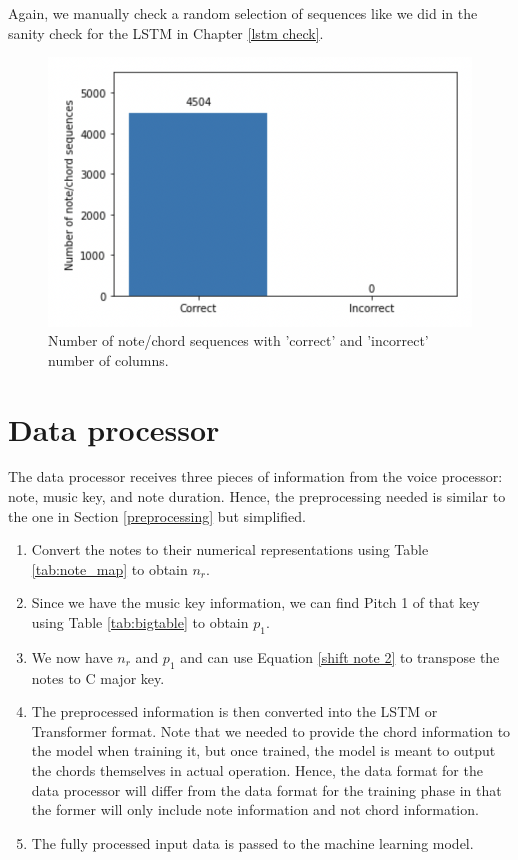 Again, we manually check a random selection of sequences like we did in the sanity check for the LSTM in Chapter \ref{lstm check}.

\begin{figure}
    \centering
    \includegraphics{Figures/Transformer check}
    \decoRule
    \caption{Number of note/chord sequences with 'correct' and 'incorrect' number of columns.}
    \label{fig:Transformer check}
    \end{figure}


\section{Data processor}
\label{data processor}
The data processor receives three pieces of information from the voice processor: note, music key, and note duration. Hence, the preprocessing needed is similar to the one in Section \ref{preprocessing} but simplified.

\begin{enumerate}
    \item Convert the notes to their numerical representations using Table \ref{tab:note_map} to obtain $n_r$.
    \item Since we have the music key information, we can find Pitch 1 of that key using Table \ref{tab:bigtable} to obtain $p_1$.
    \item We now have $n_r$ and $p_1$ and can use Equation \ref{shift note 2} to transpose the notes to C major key.
    \item The preprocessed information is then converted into the LSTM or Transformer format. Note that we needed to provide the chord information to the model when training it, but once trained, the model is meant to output the chords themselves in actual operation. Hence, the data format for the data processor will differ from the data format for the training phase in that the former will only include note information and not chord information.
    \item The fully processed input data is passed to the machine learning model.
  \end{enumerate}

